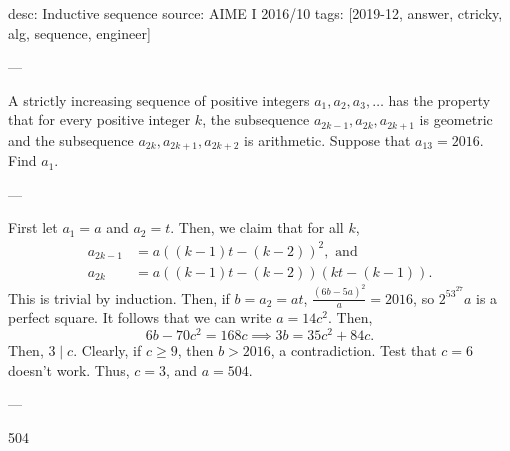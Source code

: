 desc: Inductive sequence
source: AIME I 2016/10
tags: [2019-12, answer, ctricky, alg, sequence, engineer]

---

A strictly increasing sequence of positive integers $a_1, a_2, a_3, \ldots$ has the property that for every positive integer $k$, the subsequence $a_{2k-1}, a_{2k}, a_{2k+1}$ is geometric and the subsequence $a_{2k}, a_{2k+1}, a_{2k+2}$ is arithmetic. Suppose that $a_{13} = 2016$. Find $a_1$.

---

First let $a_1=a$ and $a_2=t$. Then, we claim that for all $k$,
\begin{align*}
    a_{2k-1}&=a((k-1)t-(k-2))^2,\text{ and}\\
    a_{2k}&=a((k-1)t-(k-2))(kt-(k-1)).
\end{align*}
This is trivial by induction. Then, if $b=a_2=at$, $\frac{(6b-5a)^2}a=2016$, so $2^53^27a$ is a perfect square. It follows that we can write $a=14c^2$. Then, \[6b-70c^2=168c\implies 3b=35c^2+84c.\]
Then, $3\mid c$. Clearly, if $c\ge 9$, then $b>2016$, a contradiction. Test that $c=6$ doesn't work. Thus, $c=3$, and $a=504$.

---

504
